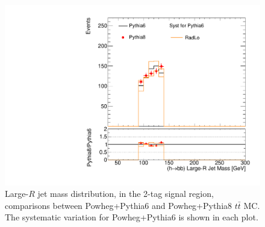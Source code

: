 \begin{figure}[!h]
\begin{center}
\includegraphics[scale=0.33]{./figures/boosted/TTBarPy6VsPy8/TTBarPy6VsPy8_SR_HbbMass_radlo}
\caption{Large-$R$ jet mass distribution, in the 2-tag signal region, comparisons between Powheg+Pythia6 and Powheg+Pythia8 $t\bar{t}$ MC. 
The systematic variation for Powheg+Pythia6 is shown in each plot.}
\label{fig:boosted_ttbarpy6py8_HbbMass}
\end{center}
\end{figure}

